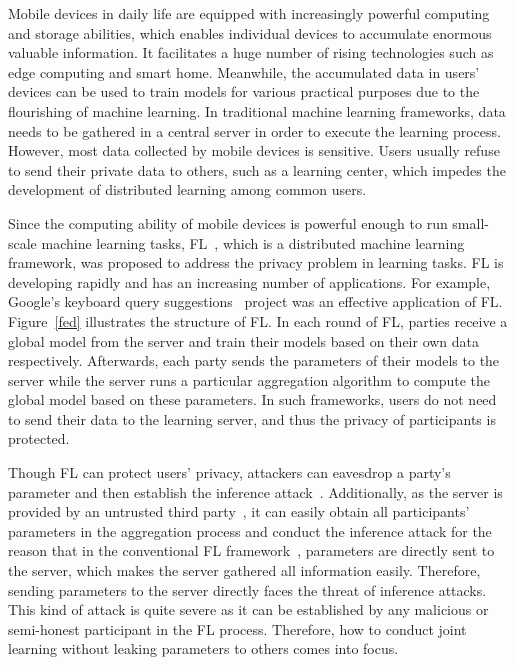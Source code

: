 Mobile devices in daily life are equipped with increasingly powerful computing and storage abilities, which enables individual devices to accumulate enormous valuable information. It facilitates a huge number of rising technologies such as edge computing and smart home. Meanwhile, the accumulated data in users' devices can be used to train models for various practical purposes due to the flourishing of machine learning. In traditional machine learning frameworks, data needs to be gathered in a central server in order to execute the learning process. However, most data collected by mobile devices is sensitive. Users usually refuse to send their private data to others, such as a learning center, which impedes the development of distributed learning among common users.

Since the computing ability of mobile devices is powerful enough to run small-scale machine learning tasks, FL~\cite{mcmahan2016communicationefficient}, which is a distributed machine learning framework, was proposed to address the privacy problem in learning tasks. FL is developing rapidly and has an increasing number of applications. For example, Google's keyboard query suggestions~\cite{yang2018applied} project was an effective application of FL. Figure~\ref{fed} illustrates the structure of FL. In each round of FL, parties receive a global model from the server and train their models based on their own data respectively. Afterwards, each party sends the parameters of their models to the server while the server runs a particular aggregation algorithm to compute the global model based on these parameters. In such frameworks, users do not need to send their data to the learning server, and thus the privacy of participants is protected.

Though FL can protect users' privacy, attackers can eavesdrop a party's parameter and then establish the inference attack~\cite{Beyond, Leakage, Nasr19}. Additionally, as the server is provided by an untrusted third party~\cite{Nasr19}, it can easily obtain all participants' parameters in the aggregation process and conduct the inference attack for the reason that in the conventional FL framework~\cite{mcmahan2016communicationefficient}, parameters are directly sent to the server, which makes the server gathered all information easily. Therefore, sending parameters to the server directly faces the threat of inference attacks. This kind of attack is quite severe as it can be established by any malicious or semi-honest participant in the FL process. Therefore, how to conduct joint learning without leaking parameters to others comes into focus.


